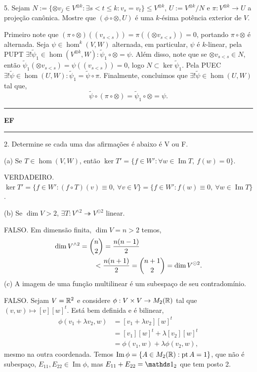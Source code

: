 5. Sejam \(N:= \{\otimes v_j \in V^{\otimes k} : \exists s < t \leq k : v_s = v_t\} \leq V^{\otimes k}\), \(U := V^{\otimes k} / N \) e \(\pi : V^{\otimes k} \to U\) a projeção canônica. Mostre que \((\phi\circ \otimes, U)\) é uma \(k\)-ésima potência exterior de \(V\).  

\textcolor{gris}{
 Primeiro note que \((\pi \circ \otimes) ((v_{s<s})) = \pi((\otimes v_{s<s})) = 0\), portando \(\pi\circ \otimes \) é alternada. Seja \(\psi \in \hom^k(V,W)\) alternada, em particular, \(\psi\) é \(k\)-linear, pela PUPT \(\exists ! \widetilde{\psi}_1 \in \hom(V^{\otimes k} , W): \widetilde{\psi}_1 \circ \otimes = \psi\). Além disso, note que se \( \otimes v_{s<s} \in N \), então \(\widetilde{\psi}_1(\otimes v_{s<s}) = \psi((v_{s<s})) = 0\), logo \(N \subset \ker \widetilde{\psi}_1 \). Pela PUEC \(\exists ! \widetilde{\psi} \in \hom(U, W): \widetilde{\psi}_1 = \widetilde{\psi} \circ \pi \). Finalmente, concluimos que \(\exists ! \widetilde{\psi} \in \hom(U,W)\) tal que, 
 \[ \widetilde{\psi} \circ (\pi \circ \otimes ) = \widetilde{\psi}_1 \circ  \otimes = \psi. \]  
}
  {\hrule \vspace{-0.15cm}
  \centering \textbf{EF} \vspace{0.1cm}
  \hrule}

2. Determine se cada uma das afirmações é abaixo é V ou F. 

(a) Se \(T \in \hom(V,W)\), então \(\ker T' = \{f\in W' : \forall w \in \operatorname{Im}T, \ f(w) = 0\}\). 

\textcolor{gris}{VERDADEIRO. \(\ker T' = \{f \in W' : (f \circ T)(v) \equiv  0, \ \forall v \in V\} = \{f \in W' : f(w) \equiv 0, \ \forall w \in \operatorname{Im}T\}\).}

(b) Se \(\dim V> 2 \), \(\exists T: V^{\wedge 2} \twoheadrightarrow V^{\odot 2}\) linear.

\textcolor{gris}{FALSO. Em dimensão finita, \(\dim V = n >2\) temos, 
\begin{align*}
  \dim V^{\wedge 2} = \binom{n}{2} &= \frac{n(n-1)}{2} \\ 
  &\hspace{-0.5cm}< \frac{n(n+1)}{2} = \binom{n +1}{2} = \dim V^{\odot 2}.
\end{align*} 
}
(c) A imagem de uma função multilinear é um subespaço de seu contradomínio. 

\textcolor{gris}{FALSO. Sejam \(V = \mathbb{R}^2\) e considere \(\phi : V \times V \to M_2(\mathbb{R})\) tal que \((v,w)\mapsto [v][w]^t\). Está bem definida e é bilinear,  
\begin{align*}
  \phi(v_1 + \lambda v_2,w) &= [v_1+\lambda v_2][w]^t \\ 
   &= [v_1][w]^t +\lambda [v_2][w]^t  \\
   &= \phi(v_1, w) + \lambda \phi(v_2,w),
\end{align*}
mesmo na outra coordenada. Temos \(\operatorname{Im}\phi = \{A \in M_2(\mathbb{R}): \operatorname{pt}A=1\}\), que não é subespaço, \(E_{11}, E_{22}\in \operatorname{Im} \phi\), mas \(E_{11} + E_{22} = \id_2\) que tem posto 2.  
}

